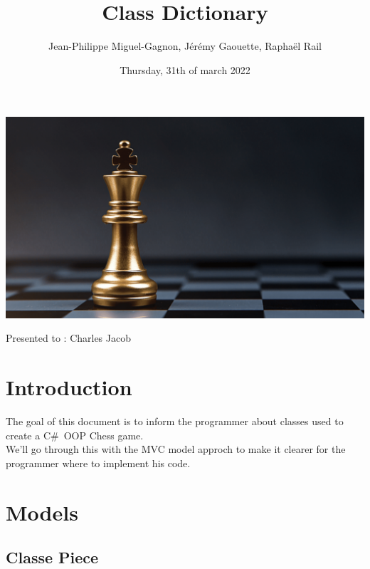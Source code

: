 \documentclass[12pt]{article}
\title{Class Dictionary}
\author{Jean-Philippe Miguel-Gagnon, Jérémy Gaouette, Raphaël Rail}
\date{Thursday, 31th of march 2022}
\begin{document}
    \begin{titlepage}
        \maketitle
        \includegraphics[width=\textwidth]{CHESS}
        \begin{center}
            Presented to : Charles Jacob
        \end{center}
    \end{titlepage}

    \tableofcontents

    \newpage


    \section{Introduction}

    The goal of this document is to inform the programmer about
    classes used to create a C\#\ OOP Chess game.
    \\

    We'll go through this with the MVC model approch to make it
    clearer for the programmer where to implement his code.

    \newpage


    \section{Models}

    \subsection{Classe Piece}
\end{document}
